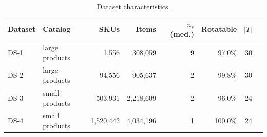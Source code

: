 \begin{table}[htbp]
\centering
\caption{Dataset characteristics.}
\label{tab:datasets_skus}
\begin{tabular}{@{}llrrrrrr@{}}
\toprule
\textbf{Dataset} & \textbf{Catalog} & \textbf{SKUs} & \textbf{Items} & \textbf{$n_s$ (med.)} & \textbf{Rotatable} & \textbf{$|T|$} \\
\midrule
DS-1 & large products & 1{,}556 & 308{,}059 & 9 & 97.0\% & 30 \\
DS-2 & large products & 94{,}556 & 905{,}637 & 2 & 99.8\% & 30 \\
DS-3 & small products & 503{,}931 & 2{,}218{,}609 & 2 & 96.0\% & 24 \\
DS-4 & small products & 1{,}520{,}442 & 4{,}034{,}196 & 1 & 100.0\% & 24 \\
\bottomrule
\end{tabular}
\end{table}